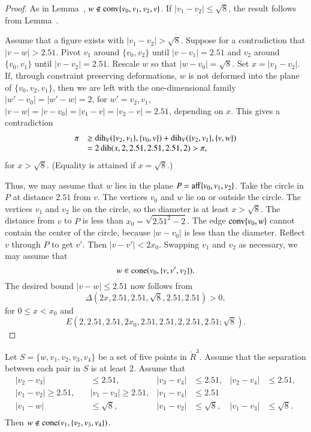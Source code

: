 \begin{proof}  As in Lemma~, 
$w\not\in{\operatorname{conv}}\{v_0,v_1,v_2,v\}$.  
If $|v_1-v_2|\le \sqrt{8}$, the result follows from
Lemma~. 

Assume that a figure exists with $|v_1-v_2|>\sqrt{8}$. Suppose for a
contradiction that $|v-w|>2.51$.    Pivot $v_1$ around $\{v_0,v_2\}$ until
$|v-v_1|=2.51$ and $v_2$ around $\{v_0,v_1\}$ until $|v-v_2|=2.51$.  Rescale
$w$ so that $|w-v_0|=\sqrt{8}$. Set $x = |v_1-v_2|$. If, through constraint
preserving deformations, $w$ is not deformed into the plane of 
$\{v_0,v_2,v_1\}$,
then we are left with the one-dimensional family $|w'-v_0|=|w'-w|=2$, for
$w'=v_2,v_1$, $|v-w|=|v-v_0|=|v_1-v|=|v_2-v|=2.51$, depending on  $x$. This
gives a contradiction
    $$
    \begin{array}{lll}
        \pi &\ge \operatorname{dih}_V(\{v_2,v_1\},\{v_0,v\}) + \operatorname{dih}_V(\{v_2,v_1\},\{v,w\})\\
        &= 2\operatorname{dih}(x,2,2.51,2.51,2.51,2)
         > \pi,
    \end{array}
    $$
for $x>\sqrt{8}$.
(Equality is attained if $x=\sqrt{8}$.)

Thus, we may assume that $w$ lies in the plane $P={\operatorname{aff}}\{v_0,v_1,v_2\}$. Take the
circle in $P$ at distance $2.51$ from $v$. The vertices $v_0$ and $w$ lie
on or outside the circle. The vertices $v_1$ and $v_2$ lie on the
circle, so the diameter is at least $x>\sqrt{8}$.  The distance from
$v$ to $P$ is less than $x_0= \sqrt{2.51^2-2}$.  The edge 
${\operatorname{conv}}\{v_0,w\}$ cannot
contain the center of the circle, because $|w-v_0|$ is less than the
diameter.
%
Reflect $v$ through $P$ to get $v'$.  Then $|v-v'|< 2x_0$. Swapping
$v_1$ and $v_2$ as necessary, we may assume that 
  $$w\in{\operatorname{cone}}(v_0,\{v,v',v_2\}).$$  
The desired bound $|v-w|\le 2.51$ now follows from
  $$
  \Delta(2x,2.51,2.51,\sqrt8,2.51,2.51)>0,
  $$
for $0\le x< x_0$ and
  $$
  E(2,2.51,2.51,2x_0,2.51,2.51,2,2.51,2.51; \sqrt8).
  $$
\end{proof}

\newpage



\begin{lemma}
Let $S=\{w,v_1,v_2,v_3,v_4\}$ be a set of five points in $\ring{R}^3$.
Assume that the separation between each pair in $S$ is at least
$2$.  Assume that
  $$
  \begin{array}{rlrlrlrlrllll}
  |v_2-v_3|&\le 2.51,& |v_3-v_4|&\le 2.51,  &|v_2-v_4|&\le 2.51,\\
  |v_1-v_2|\ge 2.51,\quad &|v_1-v_3|\ge 2.51,&|v_1-v_4|&\le 2.51\\
  |v_1-w|&\le \sqrt8,&|v_1-v_2|&\le \sqrt8,&|v_1-v_3|&\le\sqrt8.\\
  \end{array}
$$
Then $w\not\in {\operatorname{cone}}(v_1,\{v_2,v_3,v_4\})$.
\end{lemma}

